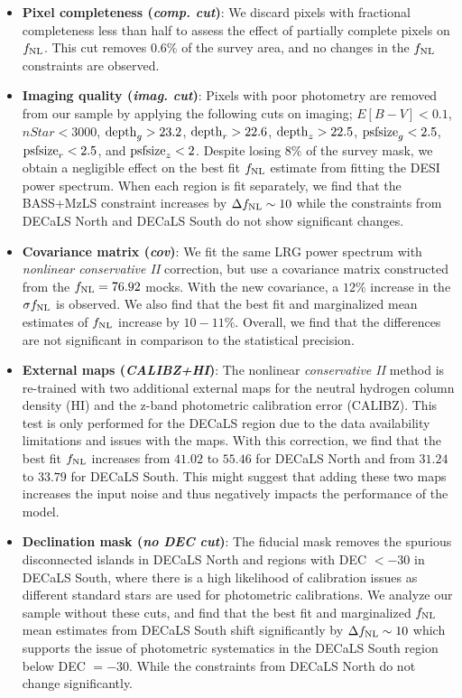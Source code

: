 \begin{itemize}[itemindent=*]
\item \textbf{Pixel completeness (\textit{comp. cut})}: We discard pixels with fractional completeness less than half to assess the effect of partially complete pixels on $f_{\rm NL}$. This cut removes $0.6\%$ of the survey area, and no changes in the $f_{\rm NL}$ constraints are observed.

\item \textbf{Imaging quality (\textit{imag. cut})}: Pixels with poor photometry are removed from our sample by applying the following cuts on imaging; $E[B-V]<0.1$, $nStar < 3000$, ${\rm depth}_{g} > 23.2$, ${\rm depth}_{r} > 22.6$, ${\rm depth}_{z} > 22.5$, ${\rm psfsize}_{g}<2.5$, ${\rm psfsize}_{r}<2.5$, and ${\rm psfsize}_{z}<2$. Despite losing $8\%$ of the survey mask, we obtain a negligible effect on the best fit $f_{\rm NL}$ estimate from fitting the DESI power spectrum. When each region is fit separately, we find that the BASS+MzLS constraint increases by $\Delta f_{\rm NL} \sim 10$ while the constraints from DECaLS North and DECaLS South do not show significant changes. 

\item \textbf{Covariance matrix (\textit{cov})}: We fit the same LRG power spectrum with \textit{nonlinear conservative II} correction, but use a covariance matrix constructed from the $f_{\rm NL}=76.92$ mocks. With the new covariance, a $12\%$ increase in the $\sigma f_{\rm NL}$ is observed. We also find that the best fit and marginalized mean estimates of $f_{\rm NL}$ increase by $10-11\%$. Overall, we find that the differences are not significant in comparison to the statistical precision.

\item \textbf{External maps (\textit{CALIBZ+HI})}: The nonlinear \textit{conservative II} method is re-trained with two additional external maps for the neutral hydrogen column density (HI) and the z-band photometric calibration error (CALIBZ). This test is only performed for the DECaLS region due to the data availability limitations and issues with the maps. With this correction, we find that the best fit $f_{\rm NL}$ increases from $41.02$ to $55.46$ for DECaLS North and from $31.24$ to $33.79$ for DECaLS South. This might suggest that adding these two maps increases the input noise and thus negatively impacts the performance of the model.

\item \textbf{Declination mask (\textit{no DEC cut})}: The fiducial mask removes the spurious disconnected islands in DECaLS North and regions with DEC $<-30$ in DECaLS South, where there is a high likelihood of calibration issues as different standard stars are used for photometric calibrations. We analyze our sample without these cuts, and find that the best fit and marginalized $f_{\rm NL}$ mean estimates from DECaLS South shift significantly by $\Delta f_{\rm NL} \sim 10$ which supports the issue of photometric systematics in the DECaLS South region below DEC $=-30$. While the constraints from DECaLS North do not change significantly. 


\end{itemize}
